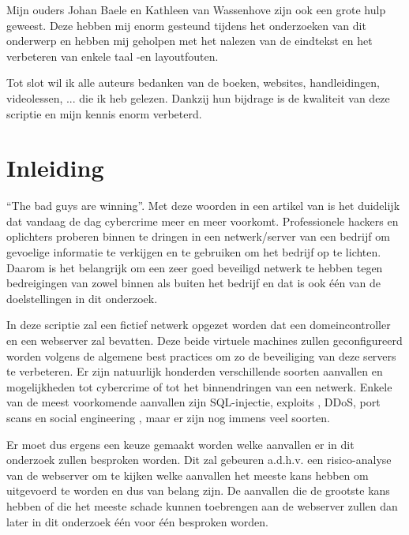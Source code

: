 \documentclass[pdftex,a4paper,12pt]{report}
\begin{document}
Mijn ouders Johan Baele en Kathleen van Wassenhove zijn ook een grote hulp geweest. Deze hebben mij enorm gesteund tijdens het onderzoeken van dit onderwerp en hebben mij geholpen met het nalezen van de eindtekst en het verbeteren van enkele taal -en layoutfouten. \newline

Tot slot wil ik alle auteurs bedanken van de boeken, websites, handleidingen, videolessen, ... die ik heb gelezen. Dankzij hun bijdrage is de kwaliteit van deze scriptie en mijn kennis enorm verbeterd. 


\tableofcontents



\chapter{Inleiding}
\label{ch:inleiding}
"`The bad guys are winning"'. Met deze woorden in een artikel van \cite{Wiener-Bronner2014} is het duidelijk dat vandaag de dag cybercrime meer en meer voorkomt. Professionele hackers en oplichters proberen binnen te dringen in een netwerk/server van een bedrijf om gevoelige informatie te verkijgen en te gebruiken om het bedrijf op te lichten. Daarom is het belangrijk om een zeer goed beveiligd netwerk te hebben tegen bedreigingen van zowel binnen als buiten het bedrijf en dat is ook één van de doelstellingen in dit onderzoek. \newline

In deze scriptie zal een fictief netwerk opgezet worden dat een domeincontroller en een webserver zal bevatten. Deze beide virtuele machines zullen geconfigureerd worden volgens de algemene best practices om zo de beveiliging van deze servers te verbeteren. Er zijn natuurlijk honderden verschillende soorten aanvallen en mogelijkheden tot cybercrime of tot het binnendringen van een netwerk. Enkele van de meest voorkomende aanvallen zijn SQL-injectie, exploits \citep{Siddharth2006}, DDoS, port scans en social engineering \citep{Gibson2011}, maar er zijn nog immens veel soorten.

Er moet dus ergens een keuze gemaakt worden welke aanvallen er in dit onderzoek zullen besproken worden. Dit zal gebeuren a.d.h.v. een risico-analyse van de webserver om te kijken welke aanvallen het meeste kans hebben om uitgevoerd te worden en dus van belang zijn. De aanvallen die de grootste kans hebben of die het meeste schade kunnen toebrengen aan de webserver zullen dan later in dit onderzoek één voor één besproken worden. \newline 
\end{document}
